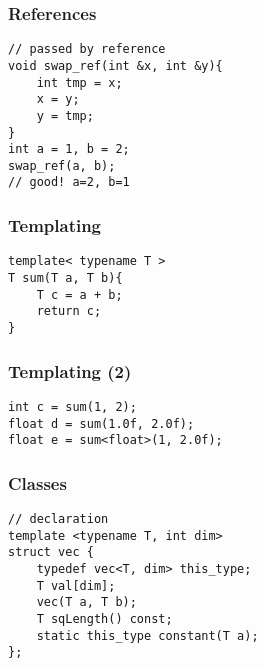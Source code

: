 
\begin{frame}
\end{frame}

\begin{frame}[fragile]
\frametitle{References}
\begin{lstlisting}
// passed by reference
void swap_ref(int &x, int &y){
    int tmp = x;
    x = y;
    y = tmp;
}
int a = 1, b = 2;
swap_ref(a, b);
// good! a=2, b=1
\end{lstlisting}
\end{frame}

\begin{frame}[fragile]
\frametitle{Templating}
\begin{lstlisting}
template< typename T >
T sum(T a, T b){
    T c = a + b;
    return c;
}
\end{lstlisting}
\end{frame}

\begin{frame}[fragile]
\frametitle{Templating (2)}
\begin{lstlisting}
int c = sum(1, 2);
float d = sum(1.0f, 2.0f);
float e = sum<float>(1, 2.0f);
\end{lstlisting}
\end{frame}

\begin{frame}[fragile]
\frametitle{Classes}
\begin{lstlisting}
// declaration
template <typename T, int dim>
struct vec {
    typedef vec<T, dim> this_type;
    T val[dim];
    vec(T a, T b);
    T sqLength() const;
    static this_type constant(T a);
};
\end{lstlisting}
\end{frame}

